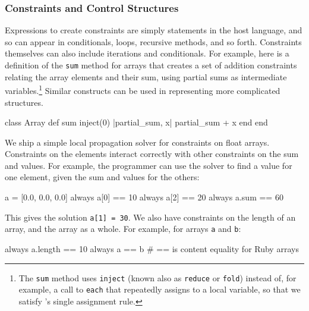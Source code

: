 \subsubsection{Constraints and Control Structures}
Expressions to create constraints are simply statements in the host
language, and so can appear in conditionals, loops, recursive methods,
and so forth.  Constraints themselves can also include iterations and
conditionals.  For example, here is a definition of the
\lstinline{sum} method for arrays that creates a set of addition
constraints relating the array elements and their sum, using partial
sums as intermediate variables.\footnote{The \lstinline{sum} method
  uses \lstinline{inject} (known also as \lstinline{reduce} or
  \lstinline{fold}) instead of, for example, a call to
  \lstinline{each} that repeatedly assigns to a local variable, so
  that we satisfy \langname's single assignment rule.} Similar
constructs can be used in representing more complicated structures.

\begin{code}
class Array
  def sum
    inject(0) { |partial_sum, x| partial_sum + x }
  end
end
\end{code}


We ship a simple local propagation solver for constraints on float
arrays. Constraints on the elements interact correctly with other
constraints on the sum and values.  For example, the programmer can
use the solver to find a value for one element, given the sum and
values for the others:

\begin{code}
a = [0.0, 0.0, 0.0]
always { a[0] == 10 }
always { a[2] == 20 }
always { a.sum == 60 }
\end{code}

This gives the solution \lstinline{a[1] = 30}.
We also have constraints on the length of an array, and the array as a
whole.  For example, for arrays \lstinline{a} and \lstinline{b}:

\begin{code}
always { a.length == 10 }
always { a == b } # == is content equality for Ruby arrays
\end{code}


